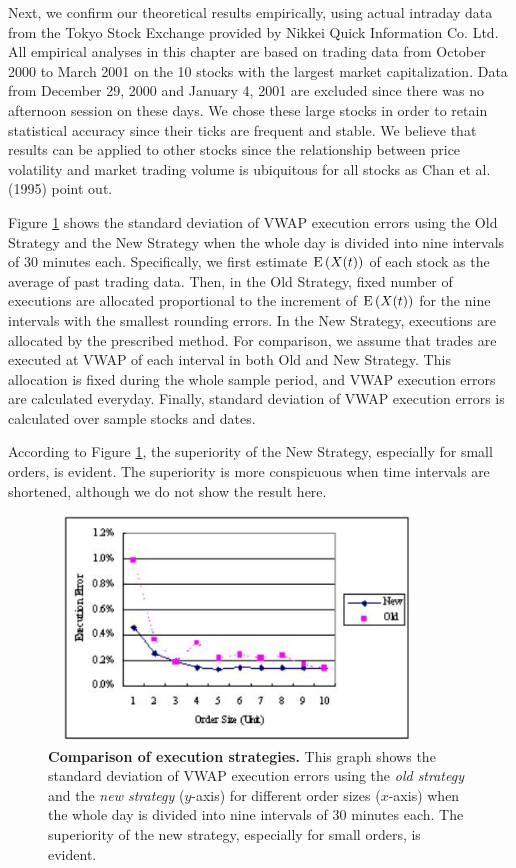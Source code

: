 Next, we confirm our theoretical results empirically, using actual intraday data from the Tokyo Stock Exchange provided by Nikkei Quick Information Co. Ltd.  All empirical analyses in this chapter are based on trading data from October 2000 to March 2001 on the 10 stocks with the largest market capitalization.  Data from December 29, 2000 and January 4, 2001 are excluded since there was no afternoon session on these days.  We chose these large stocks in order to retain statistical accuracy since their ticks are frequent and stable.  We believe that results can be applied to other stocks since the relationship between price volatility and market trading volume is ubiquitous for all stocks as Chan et al. (1995) point out.  

Figure \ref{fg_s2} shows the standard deviation of VWAP execution errors using the Old Strategy and the New Strategy when the whole day is divided into nine intervals of 30 minutes each.  Specifically, we first estimate ${\mathrm{E}}\left( X(t) \right)$ of each stock as the average of past trading data.  Then, in the Old Strategy, fixed number of executions are allocated proportional to the increment of ${\mathrm{E}}\left( X(t) \right)$ for the nine intervals with the smallest rounding errors.  In the New Strategy, executions are allocated by the prescribed method.  For comparison, we assume that trades are executed at VWAP of each interval in both Old and New Strategy.  This allocation is fixed during the whole sample period, and VWAP execution errors are calculated everyday.  Finally, standard deviation of VWAP execution errors is calculated over sample stocks and dates.

According to Figure \ref{fg_s2}, the superiority of the New Strategy, especially for small orders, is evident.  The superiority is more conspicuous when time intervals are shortened, although we do not show the result here.

\begin{figure}[htbp]
\begin{center}
 \includegraphics[width=10cm,height=6cm]{fg_s2n.png}
\end{center}
\caption[Comparison of execution strategies]
{{\bf Comparison of execution strategies.}
 \quad This graph shows the standard deviation of VWAP execution errors using the {\it old strategy} and the {\it new strategy}
($y$-axis) for different order sizes ($x$-axis) when the whole day is divided into nine intervals of 30 minutes
each.
 The superiority of the new strategy, especially for small orders, is evident.}\label{fg_s2}
\end{figure}


